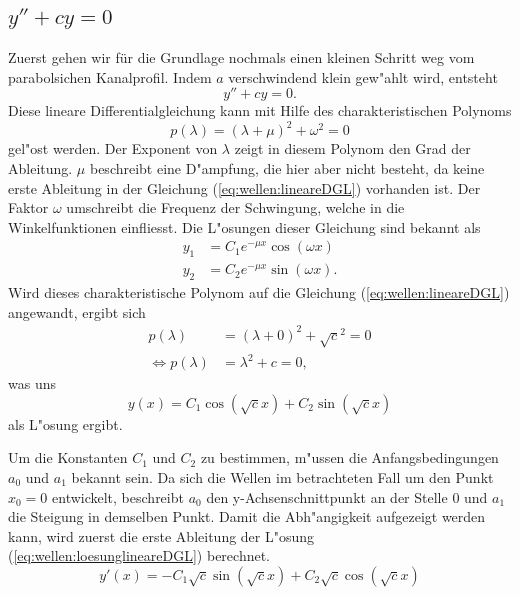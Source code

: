 \subsection{\texorpdfstring{$y''+cy = 0$}{y''+cy = 0}}
Zuerst gehen wir für die Grundlage nochmals einen kleinen Schritt weg vom 
parabolsichen Kanalprofil. Indem $a$ verschwindend klein gew"ahlt wird, entsteht
\begin{equation}
	y''+ cy = 0.
	\label{eq:wellen:lineareDGL}
\end{equation}
Diese lineare Differentialgleichung kann mit Hilfe des charakteristischen 
Polynoms
\begin{equation*}
	p(\lambda) = (\lambda+\mu)^2+\omega^2 = 0
\end{equation*}
gel"ost werden. Der Exponent von $\lambda$ zeigt in diesem Polynom den Grad der 
Ableitung. $\mu$ beschreibt eine D"ampfung, die hier aber nicht besteht, da 
keine erste Ableitung in der Gleichung (\ref{eq:wellen:lineareDGL}) vorhanden 
ist. Der Faktor $\omega$ umschreibt die Frequenz der Schwingung, welche in die 
Winkelfunktionen einfliesst. Die L"osungen dieser Gleichung sind bekannt als
\begin{equation*}
	\begin{split}
		y_1 &= C_1e^{-\mu x}\cos(\omega x) \\
		y_2 &= C_2e^{-\mu x}\sin(\omega x).
	\end{split}
\end{equation*}
Wird dieses charakteristische Polynom auf die Gleichung 
(\ref{eq:wellen:lineareDGL}) angewandt, ergibt sich
\begin{equation*}
	\begin{split}
		p(\lambda) &= (\lambda+0)^2+\sqrt{c}^2 = 0 \\
		\Leftrightarrow p(\lambda) &= \lambda^2+c = 0,
	\end{split}
\end{equation*}
was uns
\begin{equation}
	y(x) = C_1 \cos(\sqrt{c}x) + C_2 \sin(\sqrt{c}x)
	\label{eq:wellen:loesunglineareDGL}
\end{equation}
als L"osung ergibt.

Um die Konstanten $C_1$ und $C_2$ zu bestimmen, m"ussen die Anfangsbedingungen 
$a_0$ und $a_1$ bekannt sein. Da sich die Wellen im betrachteten Fall um den 
Punkt $x_0=0$ entwickelt, beschreibt $a_0$ den y-Achsenschnittpunkt an 
der Stelle $0$ und $a_1$ die Steigung in demselben Punkt. Damit die 
Abh"angigkeit aufgezeigt werden kann, wird zuerst die erste Ableitung der 
L"osung (\ref{eq:wellen:loesunglineareDGL}) berechnet.
\begin{equation}
	y'(x)=-C_1 \sqrt{c} \sin(\sqrt{c}x) + C_2 \sqrt{c} \cos(\sqrt{c}x)
\end{equation}

